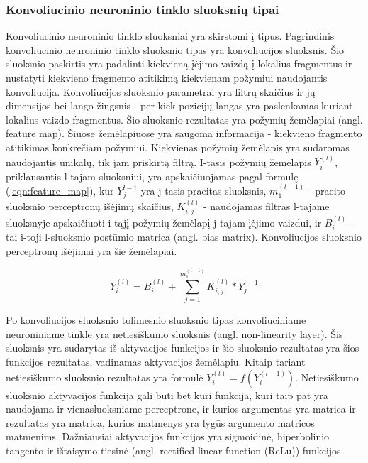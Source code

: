 \subsubsection{Konvoliucinio neuroninio tinklo sluoksnių tipai}

Konvoliucinio neuroninio tinklo sluoksniai yra skirstomi į tipus. Pagrindinis konvoliucinio neuroninio tinklo sluoksnio tipas yra konvoliucijos sluoksnis. Šio sluoksnio paskirtis yra padalinti kiekvieną įėjimo vaizdą į lokalius fragmentus ir nustatyti kiekvieno fragmento atitikimą kiekvienam požymiui naudojantis konvoliucija. Konvoliucijos sluoksnio parametrai yra filtrų skaičius ir jų dimensijos bei lango žingsnis - per kiek pozicijų langas yra paslenkamas kuriant lokalius vaizdo fragmentus. Šio sluoksnio rezultatas yra požymių žemėlapiai (angl. feature map). Šiuose žemėlapiuose yra saugoma informacija - kiekvieno fragmento atitikimas konkrečiam požymiui. Kiekvienas požymių žemėlapis yra sudaromas naudojantis unikalų, tik jam priskirtą filtrą. I-tasis požymių žemėlapis $Y_i^{(l)}$, priklausantis l-tajam sluoksniui, yra apskaičiuojamas pagal formulę (\ref{eqn:feature_map}), kur $Y_j^{l-1}$ yra j-tasis praeitas sluoksnis, $m_1^{(l-1)}$ - praeito sluoksnio perceptronų išėjimų skaičius, $K_{i,j}^{(l)}$ - naudojamas filtras l-tajame sluoksnyje apskaičiuoti i-tąjį požymių žemėlapį j-tajam įėjimo vaizdui, ir $B_i^{(l)}$ - tai i-toji l-sluoksnio postūmio matrica (angl. bias matrix). Konvoliucijos sluoksnio perceptronų išėjimai yra šie žemėlapiai.

\begin{equation}
\label{eqn:feature_map}
	Y_i^{(l)} = B_i^{(l)} + \sum_{j = 1}^{m_1^{(l-1)}} K_{i,j}^{(l)} * Y_j^{l-1}
\end{equation}


Po konvoliucijos sluoksnio tolimesnio sluoksnio tipas konvoliuciniame neuroniniame tinkle yra netiesiškumo sluoksnis (angl. non-linearity layer). Šis sluoksnis yra sudarytas iš aktyvacijos funkcijos ir šio sluoksnio rezultatas yra šios funkcijos rezultatas, vadinamas aktyvacijos žemėlapiu. Kitaip tariant netiesiškumo sluoksnio rezultatas yra formulė $Y_i^{(l)} = f(Y_i^{(l - 1)})$. Netiesiškumo sluoksnio aktyvacijos funkcija gali būti bet kuri funkcija, kuri taip pat yra naudojama ir vienasluoksniame perceptrone, ir kurios argumentas yra matrica ir rezultatas yra matrica, kurios matmenys yra lygūs argumento matricos matmenims. Dažniausiai aktyvacijos funkcijos yra sigmoidinė, hiperbolinio tangento ir ištaisymo tiesinė (angl. rectified linear function (ReLu)) funkcijos.

